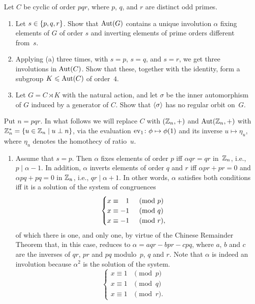 \begin{solution}
\begin{probl}
    Let\/ $C$ be cyclic of order\/ $pqr$, where\/ $p$,\/ $q$, and\/ $r$ are distinct odd primes.
    \begin{enumerate}[\rm a)]
        \item Let\/ $s \in \{p, q, r\}$. Show that\/ ${\rm Aut}(G)$ contains a unique involution\/ $\alpha$ fixing elements of\/ $G$ of order\/ $s$ and inverting elements of prime orders different from\/~$s$.
        \item Applying\/ {\rm(a)} three times, with\/ $s = p$,\/ $s = q$, and\/ $s = r$, we get three involutions in\/ ${\rm Aut}(C)$. Show that these, together with the identity, form a subgroup\/ $K \leqslant {\rm Aut}(C)$ of order\/~$4$.
        \item Let\/ $G = C\rtimes K$ with the natural action, and let\/ $\sigma$ be the inner automorphism of\/ $G$ induced by a generator of\/ $C$. Show that\/ $\langle\sigma\rangle$ has no regular orbit on~$G$.
    \end{enumerate}
\end{probl} 

\begin{solution} Put $n=pqr$. In what follows we will replace $C$ with $(\mathbb{Z}_n,+)$ and ${\rm Aut}(\mathbb{Z}_n,+)$ with $\mathbb{Z}_n^*=\{u\in\mathbb{Z}_n\mid u\perp n\}$, via the evaluation ${\rm ev}_{1}\colon\phi\mapsto\phi(1)$ and its inverse $u\mapsto\eta_u$, where $\eta_u$ denotes the homothecy of ratio~$u$.

\begin{enumerate}[\rm a)]
    \item Assume that $s=p$. Then $\alpha$ fixes elements of order $p$ iff $\alpha qr=qr$ in~$\mathbb{Z}_n$, i.e., $p\mid\alpha-1$. In addition, $\alpha$ inverts elements of order $q$ and $r$ iff $\alpha pr+pr=0$ and $\alpha pq+pq=0$ in $\mathbb{Z}_n$, i.e., $qr\mid\alpha+1$. In other words, $\alpha$ satisfies both conditions iff it is a solution of the system of congruences
    $$
        \begin{cases}
            x\equiv\hphantom-1&{}\pmod p\\
            x\equiv-1&{}\pmod q\\
            x\equiv-1&{}\pmod r,
        \end{cases}
    $$
    of which there is one, and only one, by virtue of the Chinese Remainder Theorem that, in this case, reduces to $\alpha=aqr-bpr-cpq$, where $a$, $b$ and $c$ are the inverses of $qr$, $pr$ and $pq$ modulo~$p$, $q$ and $r$. Note that $\alpha$ is indeed an involution because $\alpha^2$ is the solution of the system.
    $$
        \begin{cases}
            x\equiv1&{}\pmod p\\
            x\equiv1&{}\pmod q\\
            x\equiv1&{}\pmod r.
        \end{cases}
    $$
    

\end{enumerate}
\end{solution}
\end{solution}

